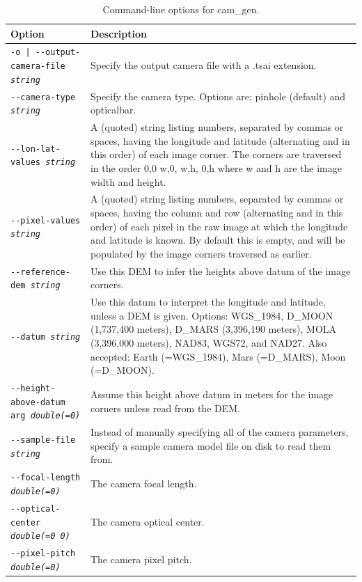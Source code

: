 \begin{longtable}{|l|p{7.5cm}|}
\caption{Command-line options for cam\_gen.}
\label{tbl:cam_gen}
\endfirsthead
\endhead
\endfoot
\endlastfoot
\hline
Option & Description \\ \hline \hline
\texttt{-o | -\/-output-camera-file \textit{string}} & Specify the output camera file with a .tsai extension.\\ \hline
\texttt{-\/-camera-type \textit{string}} & Specify the camera type. Options are: pinhole (default) and opticalbar.\\ \hline
\texttt{-\/-lon-lat-values \textit{string} } &A (quoted) string listing numbers, separated by commas or spaces, having the longitude and latitude (alternating and in this order) of each image corner. The corners are traversed in the order 0,0 w,0, w,h, 0,h where w and h are the image width and height.\\ \hline
\texttt{-\/-pixel-values \textit{string} } & A (quoted) string listing numbers, separated by commas or spaces, having the column and row (alternating and in this order) of each pixel in the raw image at which the longitude and latitude is known. By default this is empty, and will be populated by the image corners traversed as earlier.\\ \hline
\texttt{-\/-reference-dem \textit{string} } & Use this DEM to infer the heights above datum of the image corners.\\ \hline
\texttt{-\/-datum \textit{string} } & Use this datum to interpret the longitude and latitude, unless a DEM is given. Options: WGS\_1984, D\_MOON (1,737,400 meters), D\_MARS (3,396,190 meters), MOLA (3,396,000 meters), NAD83, WGS72, and NAD27. Also accepted: Earth (=WGS\_1984), Mars (=D\_MARS), Moon (=D\_MOON).\\ \hline
\texttt{-\/-height-above-datum arg \textit{double(=0)} } & Assume this height above datum in meters for the image corners unless read from the DEM.\\ \hline
\texttt{-\/-sample-file \textit{string}} & Instead of manually specifying all of the camera parameters, specify a sample camera model file on disk to read them from.\\ \hline
\texttt{-\/-focal-length \textit{double(=0)} } & The camera focal length.\\ \hline
\texttt{-\/-optical-center \textit{double(=0 0)}} & The camera optical center.\\ \hline
\texttt{-\/-pixel-pitch \textit{double(=0)} } & The camera pixel pitch. \\ \hline

\end{longtable}
